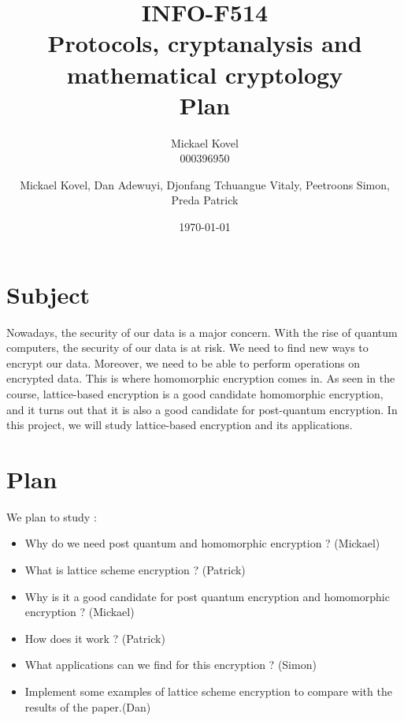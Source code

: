 \documentclass{article}
\begin{document}
\begin{figure}[t]
	\label{fig:ulbLogo}
\end{figure}
\author {Mickael Kovel\\000396950}
\date{\today}
\title{INFO-F514 \\ Protocols, cryptanalysis and mathematical cryptology \\ Plan}
\author{Mickael Kovel, Dan Adewuyi, Djonfang Tchuangue Vitaly, Peetroons Simon, Preda Patrick}
\maketitle
\newpage


\section{\label{sec:subj}Subject}
Nowadays, the security of our data is a major concern. With the rise of quantum computers,
the security of our data is at risk. We need to find new ways to encrypt our data.
Moreover, we need to be able to perform operations on encrypted data. This is where
homomorphic encryption comes in.
As seen in the course, lattice-based encryption is a good candidate homomorphic encryption,
and it turns out that it is also a good candidate for post-quantum encryption.
In this project, we will study lattice-based encryption and its applications.

\section{\label{sec:Plan}Plan}
We plan to study : 
\begin{itemize}
    \item Why do we need post quantum and homomorphic encryption ? (Mickael)
    \item What is lattice scheme encryption ? (Patrick)
    \item Why is it a good candidate for post quantum encryption and homomorphic encryption ? (Mickael)
    \item How does it work ? (Patrick)
    \item What applications can we find for this encryption ? (Simon)
      \item Implement some examples of lattice scheme encryption to compare with the 
        results of the paper.(Dan)
\end{itemize}
\end{document}
